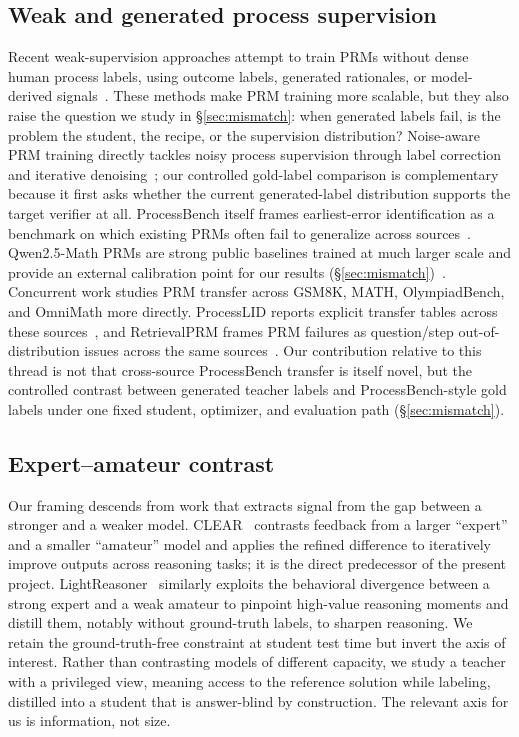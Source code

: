 \documentclass{article}
\begin{document}
\subsection{Weak and generated process supervision}
\label{sec:related-weak}
Recent weak-supervision approaches attempt to train PRMs without dense human
process labels, using outcome labels, generated rationales, or model-derived
signals~\cite{sun2025freeprm}. These methods make PRM training more
scalable, but they also raise the question we study in
\S\ref{sec:mismatch}: when generated labels fail, is the problem the
student, the recipe, or the supervision distribution? Noise-aware PRM
training directly tackles noisy process supervision through label correction
and iterative denoising~\cite{xie2026noiseaware}; our controlled gold-label
comparison is complementary because it first asks whether the current
generated-label distribution supports the target verifier at all. ProcessBench itself
frames earliest-error identification as a benchmark on which existing PRMs
often fail to generalize across sources~\cite{zheng2024processbench}.
Qwen2.5-Math PRMs are strong public baselines trained at much larger scale
and provide an external calibration point for our results
(\S\ref{sec:mismatch})~\cite{zhang2025qwenmathprm,qwen25mathprm800k}.
Concurrent work studies PRM transfer across GSM8K, MATH, OlympiadBench, and
OmniMath more directly. ProcessLID reports explicit transfer tables across
these sources~\cite{bai2026processlid}, and RetrievalPRM frames PRM failures
as question/step out-of-distribution issues across the same
sources~\cite{zhu2025retrievalprm}. Our contribution relative to this thread
is not that cross-source ProcessBench transfer is itself novel, but the
controlled contrast between generated teacher labels and ProcessBench-style
gold labels under one fixed student, optimizer, and evaluation path
(\S\ref{sec:mismatch}).

\subsection{Expert--amateur contrast}
Our framing descends from work that extracts signal from the gap between a
stronger and a weaker model. CLEAR~\cite{rufail2025clear} contrasts feedback
from a larger ``expert'' and a smaller ``amateur'' model and applies the
refined difference to iteratively improve outputs across reasoning tasks; it
is the direct predecessor of the present project. LightReasoner~\cite{wang2025lightreasoner}
similarly exploits the behavioral divergence between a strong expert and a
weak amateur to pinpoint high-value reasoning moments and distill them,
notably without ground-truth labels, to sharpen reasoning. We retain the
ground-truth-free constraint at student test time but invert the axis of
interest. Rather than contrasting models of different capacity, we study a
teacher with a privileged view, meaning access to the reference solution
while labeling, distilled into a student that is answer-blind by
construction.
The relevant axis for us is information, not size.
\end{document}
